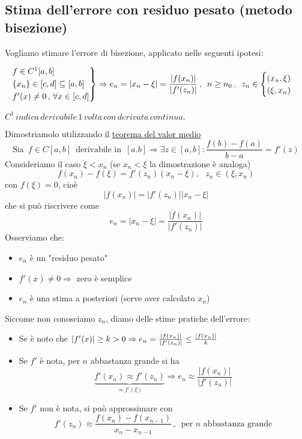 \subsection{Stima dell'errore con residuo pesato (metodo bisezione)}
Vogliamo stimare l'errore di bisezione, applicato nelle seguenti ipotesi:

\begin{equation*}
\begin{rcases}
f  \in C^1[a,b]\\
\{x_n\}  \in [c,d] \subseteq [a,b]\\
f'(x)\ne 0 \,,\, \forall x \in [c,d]
\end{rcases}
\Rightarrow e_n = |x_n-\xi| = \frac{|f(x_n)|}{|f'(z_n)|} \,,\,\text{   } n\ge n_0 \,,\,\text{   } z_n \in
\begin{cases}
(x_n, \xi) \\
(\xi, x_n)
\end{cases}
\end{equation*}
\begin{center}
	$C^1 \,indica \,derivabile \,1 \,volta\, con \,derivata\, continua.$
\end{center}
Dimostriamolo utilizzando il \underline{teorema del valor medio}
\[
\text{Sia } \,f\in C[a,b]\,\,\, \text{derivabile in }\, [a.b] \Rightarrow \exists z\in [a,b] : \frac{f(b)-f(a)}{b-a}=f'(z)
\]
Consideriamo il caso $\xi<x_n$ (se $x_n<\xi$ la dimostrazione è analoga)
\begin{equation*}
f(x_n)-f(\xi) = f'(z_n)(x_n-\xi), \text{ } z_n \in (\xi,x_n)
\end{equation*}
con $f(\xi)=0$, cioè
\begin{equation*}
|f(x_n)| = |f'(z_n)||x_n-\xi|
\end{equation*}
che si può riscrivere come
\begin{equation*}
e_n = |x_n-\xi| = \frac{|f(x_n)|}{|f'(z_n)|}
\end{equation*}
Osserviamo che:
\begin{itemize}
	\item $e_n$ è un "residuo pesato"
	\item $f'(x)\ne 0 \Rightarrow$ zero è semplice
	\item $e_n$ è una stima a posteriori (serve aver calcolato $x_n$)
\end{itemize}
Siccome non conosciamo $z_n$, diamo delle stime pratiche dell'errore:
\begin{itemize}
	\item Se è noto che $\abs*{f'(x)}\ge k>0 \Rightarrow e_n=\frac{|f(x_n)|}{|f'(z_n)|}\le  \frac{|f(x_n)|}{k}$
	\item Se $f'$ è nota, per $n$ abbastanza grande si ha
	\[
	\underbrace{f'(x_n)\approx f'(z_n)}_{\approx f'(\xi)} \Longrightarrow e_n \approx \frac{|f(x_n)|}{|f'(z_n)|}
	\]
	\item Se $f'$ non è nota, si può approssimare con
	\[
	f'(z_n)\approx \frac{f(x_n)-f(x_{n-1})}{x_n-x_{n-1}}\,,\,\,\, \text{per $n$ abbastanza grande}
	\]
\end{itemize}
